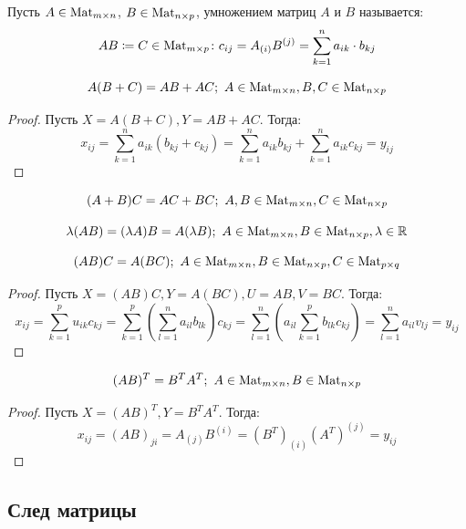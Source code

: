 \documentclass[12pt]{article}
\begin{document}
\begin{definition}
	Пусть $A \in \operatorname{Mat}_{m \times n}$, $B \in \operatorname{Mat}_{n \times p}$,
	умножением матриц $A$ и $B$ называется:
	\[AB \coloneqq C \in \operatorname{Mat}_{m \times p} \colon
	c_{ij}=A_{(i)}B^{(j)}=\sum_{k=1}^{n}a_{ik}\cdot b_{kj}\]
\end{definition}
\begin{statement}
	\[A(B+C) = AB + AC;\  A \in \operatorname{Mat}_{m \times n}, B, C \in \operatorname{Mat}_{n
	\times p}\]	
	\begin{proof}
		Пусть $X=A(B+C), Y=AB + AC$. Тогда:
		\[x_{ij}=\sum_{k=1}^na_{ik}(b_{kj}+c_{kj})=\sum_{k=1}^{n}a_{ik}b_{kj}+\sum_{k=1}^{n}a_{ik}c_{kj}=y_{ij}\]	
	\end{proof}
\end{statement}
\begin{statement}
	\[(A+B)C = AC + BC;\  A, B \in \operatorname{Mat}_{m \times n}, C \in \operatorname{Mat}_{n
	\times p}\]
\end{statement}
\begin{statement}
	\[\lambda(AB)=(\lambda A)B=A(\lambda B);\ A \in \mat_{m \times n}, B
	\in \mat_{n \times p}, \lambda \in \R\]
\end{statement}
\begin{statement}
	\[(AB)C=A(BC);\ A \in \operatorname{Mat}_{m \times n}, B \in \operatorname{Mat}_{n \times p}, C
	\in \operatorname{Mat}_{p \times q}\]	
	\begin{proof}
		Пусть $X=(AB)C, Y=A(BC), U=AB, V=BC$. Тогда:
		\[x_{ij}=\sum_{k=1}^p u_{ik}c_{kj} =
		\sum_{k=1}^{p}\left(\sum_{l=1}^{n}a_{il}b_{lk}\right)c_{kj}=\sum_{l=1}^{n}\left(a_{il}\sum_{k=1}^{p}b_{lk}c_{kj}\right)=\sum_{l=1}^{n}a_{il}v_{lj}=y_{ij}\]	
	\end{proof}
\end{statement}
\begin{statement}
	\[(AB)^T=B^TA^T;\ A \in \operatorname{Mat}_{m \times n}, B \in \operatorname{Mat}_{n \times p}\]	
	\begin{proof}
		Пусть $X=(AB)^T, Y=B^TA^T$. Тогда:
		\[x_{ij}=(AB)_{ji}=A_{(j)}B^{(i)}=(B^T)_{(i)}(A^T)^{(j)}=y_{ij}\]	
	\end{proof}
\end{statement}

\subsection{След матрицы}
\end{document}
